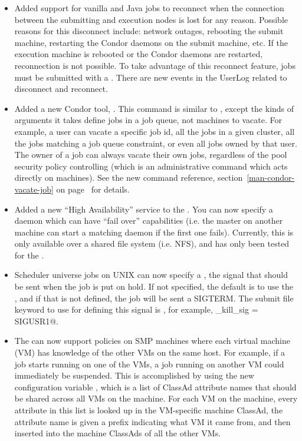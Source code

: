 \begin{itemize}

\item Added support for vanilla and Java jobs to reconnect when the
  connection between the submitting and execution nodes is lost for
  any reason.
  Possible reasons for this disconnect include: network outages,
  rebooting the submit machine, restarting the Condor daemons on the
  submit machine, etc.
  If the execution machine is rebooted or the Condor daemons are
  restarted, reconnection is not possible.
  To take advantage of this reconnect feature, jobs must be submitted
  with a .
  There are new events in the UserLog related to disconnect and
  reconnect.

\item Added a new Condor tool, .
  This command is similar to , except the kinds of
  arguments it takes define jobs in a job queue, not machines to
  vacate.
  For example, a user can vacate a specific job id, all the jobs in a
  given cluster, all the jobs matching a job queue constraint, or even
  all jobs owned by that user.
  The owner of a job can always vacate their own jobs, regardless of
  the pool security policy controlling  (which is an
  administrative command which acts directly on machines).
  See the new command reference, section~\ref{man-condor-vacate-job}
  on page~\pageref{man-condor-vacate-job} for details.
  
\item Added a new ``High Availability'' service to the .
   You can now specify a daemon which can have ``fail over'' capabilities
   (i.e. the master on another machine can start a matching daemon if the
   first one fails).  Currently, this is only available over a shared
   file system (i.e. NFS), and has only been tested for the .

\item Scheduler universe jobs on UNIX can now specify a
  , the signal that should be sent when the job is
  put on hold.
  If not specified, the default is to use the , and if
  that is not defined, the job will be sent a SIGTERM.
  The submit file keyword to use for defining this signal is
  , for example,
  \verb@hold_kill_sig = SIGUSR1@.

\item The  can now support policies on SMP machines
  where each virtual machine (VM) has knowledge of the other VMs on
  the same host.
  For example, if a job starts running on one of the VMs, a job
  running on another VM could immediately be suspended.
  This is accomplished by using the new configuration variable
  , which is a list of ClassAd attribute
  names that should be shared across all VMs on the machine.
  For each VM on the machine, every attribute in this list is looked
  up in the VM-specific machine ClassAd, the attribute name is given a
  prefix indicating what VM it came from, and then inserted into the
  machine ClassAds of all the other VMs.


\end{itemize}
